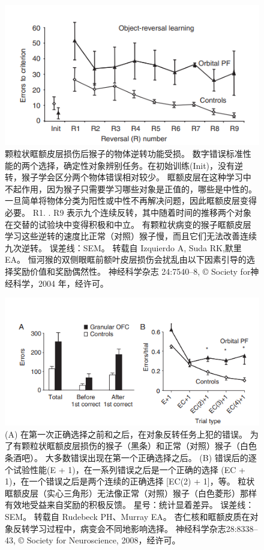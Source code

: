 \begin{figure}[!htb]
	\centering
	\includegraphics{image_pfc/Fig_4_7}
	\caption{颗粒状眶额皮层损伤后猴子的物体逆转功能受损。
		数字错误标准性能的两个选择，确定性对象辨别任务。在初始训练(Init)，没有逆转，猴子学会区分两个物体错误相对较少。
		眶额皮层在这种学习中不起作用，因为猴子只需要学习哪些对象是正值的，哪些是中性的。
		一旦简单将物体分类为阳性或中性不再解决问题，因此眶额皮层变得必要。
		R1. . R9 表示九个连续反转，其中随着时间的推移两个对象在交替的试验块中变得积极和中立。
		有颗粒状病变的猴子眶额皮层学习这些逆转的速度比正常（对照）猴子慢，而且它们无法改善连续九次逆转。
		误差线：SEM。 
		转载自 Izquierdo A, Suda RK,默里EA。
		恒河猴的双侧眼眶前额叶皮层损伤会扰乱由以下因素引导的选择奖励价值和奖励偶然性。
		神经科学杂志 24:7540–8, © Society for神经科学，2004 年，经许可。}
	\label{fig:fig_4_7}
\end{figure}


\begin{figure}[!htb]
	\centering
	\includegraphics{image_pfc/Fig_4_8}
	\caption{(A) 在第一次正确选择之前和之后，在对象反转任务上犯的错误。
		为了有颗粒状眶额皮层损伤的猴子（黑条）和正常（对照）猴子（白色条酒吧）。
		大多数错误出现在第一个正确选择之后。
		(B) 错误后的逐个试验性能(E + 1)，在一系列错误之后是一个正确的选择 (EC + 1)，在一个错误之后是两个连续的正确选择 [EC(2) + 1]，等。
		粒状眶额皮层（实心三角形）无法像正常（对照）猴子（白色菱形）那样有效地受益来自奖励的积极反馈。
		星号：统计显着差异。
		误差线：SEM。
		转载自 Rudebeck PH、Murray EA。 杏仁核和眶额皮质在对象反转学习过程中，病变会不同地影响选择。
		神经科学杂志28:8338–43, © Society for Neuroscience, 2008，经许可。}
	\label{fig:fig_4_8}
\end{figure}


